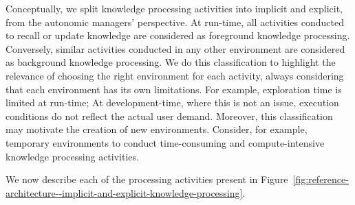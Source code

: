 Conceptually, we split knowledge processing activities into implicit and explicit, from the autonomic managers' perspective. At run-time, all activities conducted to recall or update knowledge are considered as foreground knowledge processing. Conversely, similar activities conducted in any other environment are considered as background knowledge processing. We do this classification to highlight the relevance of choosing the right environment for each activity, always considering that each environment has its own limitations. For example, exploration time is limited at run-time; At development-time, where this is not an issue, execution conditions do not reflect the actual user demand. Moreover, this classification may motivate the creation of new environments. Consider, for example, temporary environments to conduct time-consuming and compute-intensive knowledge processing activities.

We now describe each of the processing activities present in Figure~\ref{fig:reference-architecture--implicit-and-explicit-knowledge-processing}.


